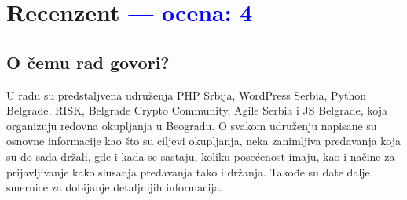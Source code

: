 \documentclass[a4paper]{report}
\newcommand{\odgovor}[1]{\textcolor{blue}{#1}}
\begin{document}
\chapter{Recenzent \odgovor{--- ocena: 4} }


\section{O čemu rad govori?}
U radu su predstaljvena udruženja PHP Srbija, WordPress Serbia, Python Belgrade, RISK, Belgrade Crypto Community, Agile Serbia i JS Belgrade, koja organizuju redovna okupljanja u Beogradu. O svakom udruženju napisane su osnovne informacije kao što su ciljevi okupljanja, neka zanimljiva predavanja koja su do sada držali, gde i kada se sastaju, koliku posećenost imaju, kao i načine za prijavljivanje kako slusanja predavanja tako i držanja. Takođe su date dalje smernice za dobijanje detaljnijih informacija.
\end{document}
